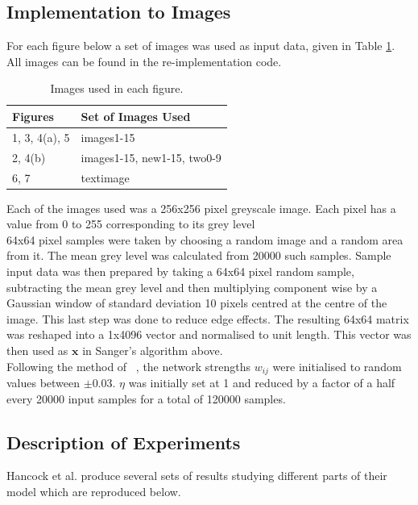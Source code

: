 \subsection{Implementation to Images}

For each figure below a set of images was used as input data, given in Table \ref{tab:Table 1}. All images can be found in the re-implementation code. 
\begin{table}[h]
    \centering
    \begin{tabular}{ll}
    \hline
    Figures&Set of Images Used\\
    \hline
    1, 3, 4(a), 5&images1-15\\
    2, 4(b)&images1-15, new1-15, two0-9\\
    6, 7&textimage\\
    \hline
    \end{tabular}
    \caption{Images used in each figure.}
    \label{tab:Table 1}
\end{table}
Each of the images used was a 256x256 pixel greyscale image. Each pixel has a value from 0 to 255 corresponding to its grey level\\
64x64 pixel samples were taken by choosing a random image and a random area from it. The mean grey level was calculated from 20000 such samples. Sample input data was then prepared by taking a 64x64 pixel random sample, subtracting the mean grey level and then multiplying component wise by a Gaussian window of standard deviation 10 pixels centred at the centre of the image. This last step was done to reduce edge effects. The resulting 64x64 matrix was reshaped into a 1x4096 vector and normalised to unit length. This vector was then used as $\textbf{x}$ in Sanger's algorithm above.\\
Following the method of ~\cite{Hancock}, the network strengths $w_{ij}$ were initialised to random values between $\pm 0.03$. $\eta$ was initially set at 1 and reduced by a factor of a half every 20000 input samples for a total of 120000 samples.

\subsection{Description of Experiments}
Hancock et al. produce several sets of results studying different parts of their model which are reproduced below.
